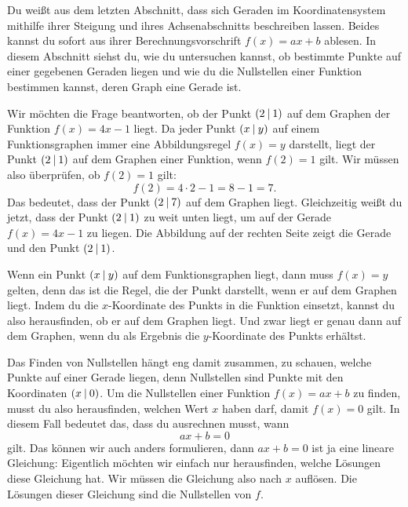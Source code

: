 \documentclass[../../main.tex]{subfiles}
\begin{document}
Du weißt aus dem letzten Abschnitt, dass sich Geraden im Koordinatensystem mithilfe ihrer Steigung und ihres Achsenabschnitts beschreiben lassen. Beides kannst du sofort aus ihrer Berechnungsvorschrift $f(x)=ax+b$ ablesen. In diesem Abschnitt siehst du, wie du untersuchen kannst, ob bestimmte Punkte auf einer gegebenen Geraden liegen und wie du die Nullstellen einer Funktion bestimmen kannst, deren Graph eine Gerade ist.

\begin{example}{}
    Wir möchten die Frage beantworten, ob der Punkt $\left(2 \:\middle|\: 1\right)$ auf dem Graphen der Funktion $f(x)=4x-1$ liegt. Da jeder Punkt $\left(x \:\middle|\: y\right)$ auf einem Funktionsgraphen immer eine Abbildungsregel $f(x)=y$ darstellt, liegt der Punkt $\left(2 \:\middle|\: 1\right)$ auf dem Graphen einer Funktion, wenn $f(2)=1$ gilt. Wir müssen also überprüfen, ob $f(2)=1$ gilt:
    \[f(2)=4\cdot 2-1=8-1=7.\]
    Das bedeutet, dass der Punkt $\left(2 \:\middle|\: 7\right)$ auf dem Graphen liegt. Gleichzeitig weißt du jetzt, dass der Punkt $\left(2 \:\middle|\: 1\right)$ zu weit unten liegt, um auf der Gerade $f(x)=4x-1$ zu liegen. Die Abbildung auf der rechten Seite zeigt die Gerade und den Punkt $\left(2 \:\middle|\: 1\right)$.
\end{example}

Wenn ein Punkt $\left(x \:\middle|\: y\right)$ auf dem Funktionsgraphen liegt, dann muss $f(x)=y$ gelten, denn das ist die Regel, die der Punkt darstellt, wenn er auf dem Graphen liegt. Indem du die $x$-Koordinate des Punkts in die Funktion einsetzt, kannst du also herausfinden, ob er auf dem Graphen liegt. Und zwar liegt er genau dann auf dem Graphen, wenn du als Ergebnis die $y$-Koordinate des Punkts erhältst.

Das Finden von Nullstellen hängt eng damit zusammen, zu schauen, welche Punkte auf einer Gerade liegen, denn Nullstellen sind Punkte mit den Koordinaten $\left(x \:\middle|\: 0\right)$. Um die Nullstellen einer Funktion $f(x)=ax+b$ zu finden, musst du also herausfinden, welchen Wert $x$ haben darf, damit $f(x)=0$ gilt. In diesem Fall bedeutet das, dass du ausrechnen musst, wann 
\[ax+b=0\] 
gilt. Das können wir auch anders formulieren, dann $ax+b=0$ ist ja eine lineare Gleichung: Eigentlich möchten wir einfach nur herausfinden, welche Lösungen diese Gleichung hat. Wir müssen die Gleichung also nach $x$ auflösen. Die Lösungen dieser Gleichung sind die Nullstellen von $f$.
\end{document}
